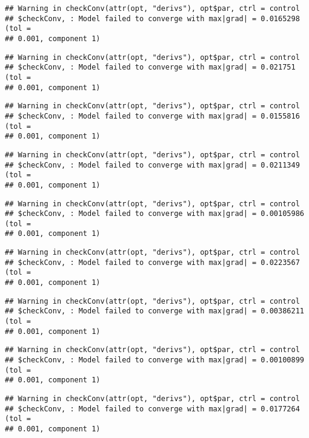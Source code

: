 \documentclass[]{article}
\begin{document}
\begin{verbatim}
## Warning in checkConv(attr(opt, "derivs"), opt$par, ctrl = control
## $checkConv, : Model failed to converge with max|grad| = 0.0165298 (tol =
## 0.001, component 1)
\end{verbatim}

\begin{verbatim}
## Warning in checkConv(attr(opt, "derivs"), opt$par, ctrl = control
## $checkConv, : Model failed to converge with max|grad| = 0.021751 (tol =
## 0.001, component 1)
\end{verbatim}

\begin{verbatim}
## Warning in checkConv(attr(opt, "derivs"), opt$par, ctrl = control
## $checkConv, : Model failed to converge with max|grad| = 0.0155816 (tol =
## 0.001, component 1)
\end{verbatim}

\begin{verbatim}
## Warning in checkConv(attr(opt, "derivs"), opt$par, ctrl = control
## $checkConv, : Model failed to converge with max|grad| = 0.0211349 (tol =
## 0.001, component 1)
\end{verbatim}

\begin{verbatim}
## Warning in checkConv(attr(opt, "derivs"), opt$par, ctrl = control
## $checkConv, : Model failed to converge with max|grad| = 0.00105986 (tol =
## 0.001, component 1)
\end{verbatim}

\begin{verbatim}
## Warning in checkConv(attr(opt, "derivs"), opt$par, ctrl = control
## $checkConv, : Model failed to converge with max|grad| = 0.0223567 (tol =
## 0.001, component 1)
\end{verbatim}

\begin{verbatim}
## Warning in checkConv(attr(opt, "derivs"), opt$par, ctrl = control
## $checkConv, : Model failed to converge with max|grad| = 0.00386211 (tol =
## 0.001, component 1)
\end{verbatim}

\begin{verbatim}
## Warning in checkConv(attr(opt, "derivs"), opt$par, ctrl = control
## $checkConv, : Model failed to converge with max|grad| = 0.00100899 (tol =
## 0.001, component 1)
\end{verbatim}

\begin{verbatim}
## Warning in checkConv(attr(opt, "derivs"), opt$par, ctrl = control
## $checkConv, : Model failed to converge with max|grad| = 0.0177264 (tol =
## 0.001, component 1)
\end{verbatim}
\end{document}
